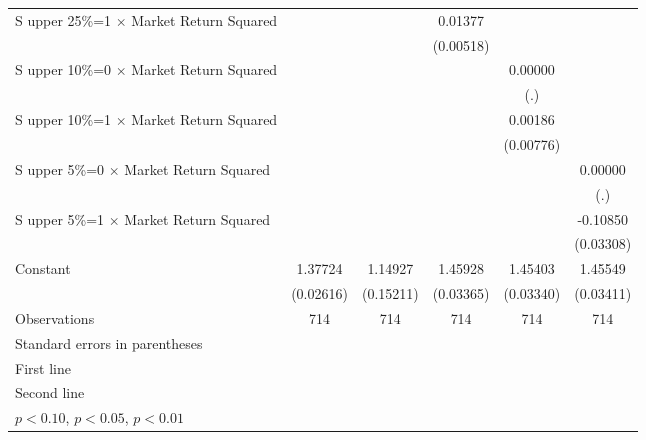\begin{table}[htbp]
\begin{tabular}{l*{5}{c}}
\addlinespace
S upper 25\%=1 $\times$ Market Return Squared&                     &                     &     0.01377\sym{***}&                     &                     \\
                    &                     &                     &   (0.00518)         &                     &                     \\
\addlinespace
S upper 10\%=0 $\times$ Market Return Squared&                     &                     &                     &     0.00000         &                     \\
                    &                     &                     &                     &         (.)         &                     \\
\addlinespace
S upper 10\%=1 $\times$ Market Return Squared&                     &                     &                     &     0.00186         &                     \\
                    &                     &                     &                     &   (0.00776)         &                     \\
\addlinespace
S upper 5\%=0 $\times$ Market Return Squared&                     &                     &                     &                     &     0.00000         \\
                    &                     &                     &                     &                     &         (.)         \\
\addlinespace
S upper 5\%=1 $\times$ Market Return Squared&                     &                     &                     &                     &    -0.10850\sym{***}\\
                    &                     &                     &                     &                     &   (0.03308)         \\
\addlinespace
Constant            &     1.37724\sym{***}&     1.14927\sym{***}&     1.45928\sym{***}&     1.45403\sym{***}&     1.45549\sym{***}\\
                    &   (0.02616)         &   (0.15211)         &   (0.03365)         &   (0.03340)         &   (0.03411)         \\
\midrule
Observations        &         714         &         714         &         714         &         714         &         714         \\
\bottomrule
\multicolumn{6}{l}{\footnotesize Standard errors in parentheses}\\
\multicolumn{6}{l}{\footnotesize First line}\\
\multicolumn{6}{l}{\footnotesize Second line}\\
\multicolumn{6}{l}{\footnotesize \sym{*} \(p<0.10\), \sym{**} \(p<0.05\), \sym{***} \(p<0.01\)}\\
\end{tabular}
\end{table}
